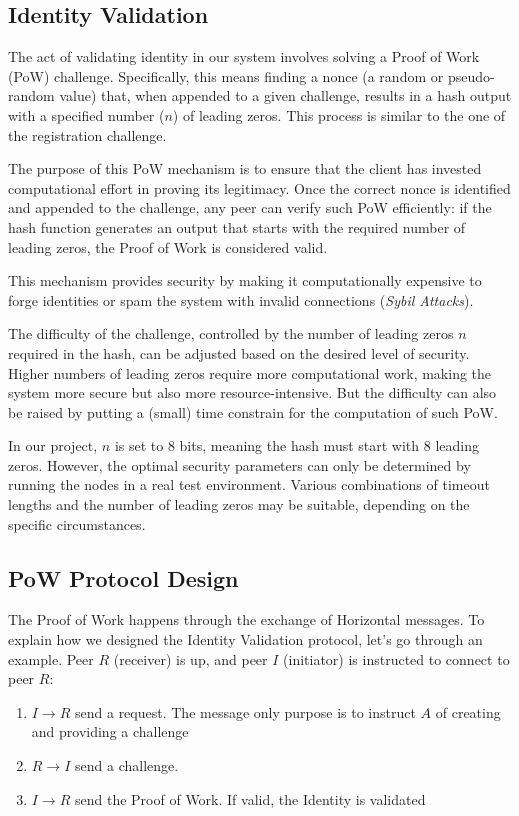 \documentclass[a4paper,english,10pt,NET]{tumarticle}
\begin{document}
\subsection{Identity Validation}

The act of validating identity in our system involves solving a Proof of Work (PoW) challenge. Specifically, this means finding a nonce (a random or pseudo-random value) that, when appended to a given challenge, results in a hash output with a specified number ($n$) of leading zeros. This process is similar to the one of the registration challenge.

The purpose of this PoW mechanism is to ensure that the client has invested computational effort in proving its legitimacy. Once the correct nonce is identified and appended to the challenge, any peer can verify such PoW efficiently: if the hash function generates an output that starts with the required number of leading zeros, the Proof of Work is considered valid.

This mechanism provides security by making it computationally expensive to forge identities or spam the system with invalid connections (\textit{Sybil Attacks}). 

The difficulty of the challenge, controlled by the number of leading zeros $n$ required in the hash, can be adjusted based on the desired level of security. Higher numbers of leading zeros require more computational work, making the system more secure but also more resource-intensive. But the difficulty can also be raised by putting a (small) time constrain for the computation of such PoW.

In our project, $n$ is set to 8 bits, meaning the hash must start with 8 leading zeros. However, the optimal security parameters can only be determined by running the nodes in a real test environment. Various combinations of timeout lengths and the number of leading zeros may be suitable, depending on the specific circumstances.

\subsection{PoW Protocol Design}

The Proof of Work happens through the exchange of Horizontal messages. To explain how we designed the Identity Validation protocol, let's go through an example. Peer $R$ (receiver) is up, and peer $I$ (initiator) is instructed to connect to peer $R$:

\begin{enumerate}
	\item $I \to R$ send a request. The message only purpose is to instruct $A$ of creating and providing a challenge
	\item $R \to I$ send a challenge. 
	\item $I \to R$ send the Proof of Work. If valid, the Identity is validated
\end{enumerate}
\end{document}
